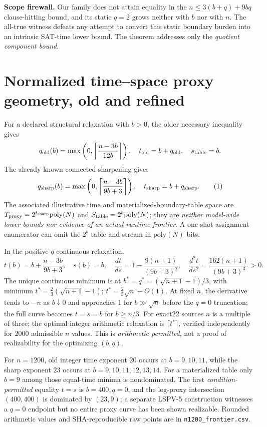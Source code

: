 \documentclass[11pt]{article}
\begin{document}
\noindent\textbf{Scope firewall.} Our family does not attain equality in the $n\le3(b+q)+9bq$ clause-hitting bound, and its static $q=2$ grows neither with $b$ nor with $n$. The all-true witness defeats any attempt to convert this static boundary burden into an intrinsic SAT-time lower bound. The theorem addresses only the \emph{quotient component bound}.

\section{Normalized time--space proxy geometry, old and refined}
For a declared structural relaxation with $b>0$, the older necessary inequality gives
\[
 q_{\rm old}(b)=\max\left(0,\left\lceil\frac{n-3b}{12b}\right\rceil\right),
 \quad t_{\rm old}=b+q_{\rm old},\quad s_{\rm table}=b.
\]
The already-known connected sharpening gives
\[
 q_{\rm sharp}(b)=\max\left(0,\left\lceil\frac{n-3b}{9b+3}\right\rceil\right),
 \quad t_{\rm sharp}=b+q_{\rm sharp}.\tag{1}
\]
The associated illustrative time and materialized-boundary-table space are $T_{\rm proxy}=2^{t_{\rm sharp}}\mathrm{poly}(N)$ and $S_{\rm table}=2^{b}\mathrm{poly}(N)$; they are \emph{neither model-wide lower bounds nor evidence of an actual runtime frontier}. A one-shot assignment enumerator can omit the $2^b$ table and stream in $\mathrm{poly}(N)$ bits.

In the positive-$q$ continuous relaxation,
\[
 t(b)=b+\frac{n-3b}{9b+3},\quad s(b)=b,\quad
 \frac{dt}{ds}=1-\frac{9(n+1)}{(9b+3)^2},\quad
 \frac{d^2t}{ds^2}=\frac{162(n+1)}{(9b+3)^3}>0.
\]
The unique continuous minimum is at $b^*=q^*=(\sqrt{n+1}-1)/3$, with minimum $t^*=\frac23(\sqrt{n+1}-1)$; $t^*=\frac23\sqrt n+O(1)$. At fixed $n$, the derivative tends to $-n$ as $b\downarrow0$ and approaches $1$ for $b\gg\sqrt n$ before the $q=0$ truncation; the full curve becomes $t=s=b$ for $b\ge n/3$. For exact22 sources $n$ is a multiple of three; the optimal integer arithmetic relaxation is $\lceil t^*\rceil$, verified independently for 2000 admissible $n$ values. This is \emph{arithmetic permitted}, not a proof of realizability for the optimizing $(b,q)$.

For $n=1200$, old integer time exponent $20$ occurs at $b=9,10,11$, while the sharp exponent $23$ occurs at $b=9,10,11,12,13,14$. For a materialized table only $b=9$ among those equal-time minima is nondominated. The first \emph{condition-permitted} equality $t=s$ is $b=400,q=0$, and the log-proxy intersection $(400,400)$ is dominated by $(23,9)$; a separate LSPV-5 construction witnesses a $q=0$ endpoint but no entire proxy curve has been shown realizable. Rounded arithmetic values and SHA-reproducible raw points are in \texttt{n1200\_frontier.csv}.
\end{document}
